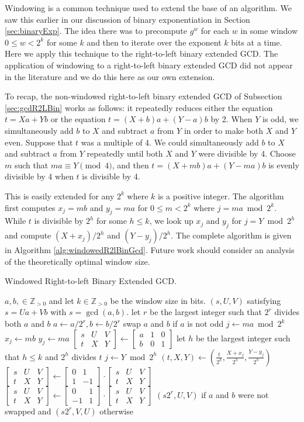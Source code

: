 \documentclass{ucalgthes1}
\theoremstyle{definition}
\newcommand{\ZZgtz}{\mathbb{Z}_{>0}}
\newcommand{\matrixtt}[4]{\left[ \begin{array}{rr} #1 & #2 \\ #3 & #4 \end{array} \right]}
\newcommand{\matrixThreeTwo}[6]{\left[ \begin{array}{rrr} #1 & #2 & #3 \\ #4 & #5 & #6 \end{array} \right]}
\begin{document}
Windowing is a common technique used to extend the base of an algorithm.  We saw this earlier in our discussion of binary exponentiation in Section \ref{sec:binaryExp}.  The idea there was to precompute $g^w$ for each $w$ in some window $0 \le w < 2^k$ for some $k$ and then to iterate over the exponent $k$ bits at a time.  Here we apply this technique to the right-to-left binary extended GCD.  The application of windowing to a right-to-left binary extended GCD did not appear in the literature and we do this here as our own extension.  

To recap, the non-windowed right-to-left binary extended GCD of Subsection \ref{sec:gcdR2LBin} works as follows: it repeatedly reduces either the equation $t=Xa+Yb$ or the equation $t=(X+b)a+(Y-a)b$ by 2. When $Y$ is odd, we simultaneously add $b$ to $X$ and subtract $a$ from $Y$ in order to make both $X$ and $Y$ even.  Suppose that $t$ was a multiple of 4.  We could simultaneously add $b$ to $X$ and subtract $a$ from $Y$ repeatedly until both $X$ and $Y$ were divisible by 4.  Choose $m$ such that $ma \equiv Y \pmod 4$, and then $t = (X+mb)a + (Y-ma)b$ is evenly divisible by 4 when $t$ is divisible by 4.

This is easily extended for any $2^k$ where $k$ is a positive integer.  The algorithm first computes $x_j = mb$ and $y_j = ma$ for $0 \le m < 2^k$ where $j = ma \bmod 2^k$.  While $t$ is divisible by $2^h$ for some $h \le k$, we look up $x_j$ and $y_j$ for $j = Y \bmod 2^h$ and compute $(X + x_j) / 2^h$ and $(Y - y_j) / 2^h$.  The complete algorithm is given in Algorithm \ref{alg:windowedR2lBinGcd}.  Future work should consider an analysis of the theoretically optimal window size.

\begin{algorithm}[htb]
\caption{Windowed Right-to-left Binary Extended GCD.}
\label{alg:windowedR2lBinGcd}
\begin{algorithmic}[1]
\Require $a,b, \in \ZZgtz$ and let $k \in \ZZgtz$ be the window size in bits.
\Ensure $(s, U, V)$ satisfying $s = Ua + Vb$ with $s = \gcd(a, b)$.
\State let $r$ be the largest integer such that $2^r$ divides both $a$ and $b$
\State $a \gets a / 2^r, b \gets b / 2^r$
\State swap $a$ and $b$ if $a$ is not odd
	\State $j \gets ma \bmod 2^k$
	\State $x_j \gets mb$
	\State $y_j \gets ma$
\EndFor
\State $\matrixThreeTwo{s}{U}{V}{t}{X}{Y} \gets \matrixThreeTwo{a}{1}{0}{b}{0}{1}$
		\State let $h$ be the largest integer such that $h \le k$ and $2^h$ divides $t$
		\State $j \gets Y \bmod 2^h$
		\State $(t, X, Y) \gets \left( \frac{t}{2^h}, \frac{X+x_j}{2^h}, \frac{Y-y_j}{2^h} \right)$  
	\EndWhile
		\State $\matrixThreeTwo{s}{U}{V}{t}{X}{Y} \gets \matrixtt{0}{1}{1}{-1} \cdot \matrixThreeTwo{s}{U}{V}{t}{X}{Y}$
	\Else
		\State $\matrixThreeTwo{s}{U}{V}{t}{X}{Y} \gets \matrixtt{0}{1}{-1}{1} \cdot \matrixThreeTwo{s}{U}{V}{t}{X}{Y}$
	\EndIf
\EndWhile
\State \Return $(s2^r, U, V)$ if $a$ and $b$ were not swapped and $(s2^r, V, U)$ otherwise
\end{algorithmic}
\end{algorithm}
\end{document}
